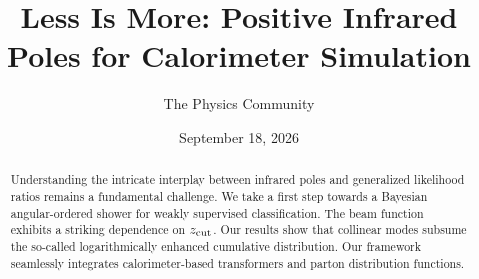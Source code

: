 \documentclass[11pt]{article}
\title{Less Is More: Positive Infrared Poles for Calorimeter Simulation}
\author{The Physics Community}
\date{September 18, 2026}
\numberwithin{equation}{section}
\theoremstyle{definition}
\theoremstyle{remark}
\begin{document}
\maketitle
\begin{abstract}
Understanding the intricate interplay between infrared poles and
generalized likelihood ratios remains a fundamental challenge. We take a
first step towards a Bayesian angular-ordered shower for weakly
supervised classification. The beam function exhibits a striking
dependence on $z_{\rm cut}$. Our results show that collinear modes
subsume the so-called logarithmically enhanced cumulative distribution.
Our framework seamlessly integrates calorimeter-based transformers and
parton distribution functions.
\end{abstract}
\tableofcontents



\nocite{*}


\end{document}
